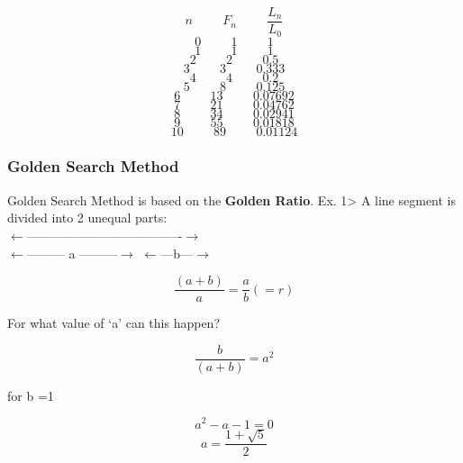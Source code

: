 \documentclass[12pt, letterpaper]{article}
\begin{document}
$$ n \hspace{1cm} F_n \hspace{1cm} \frac{L_n}{L_0}  $$
$$ 0 \hspace{1cm} 1	  \hspace{1cm}		1 $$
$$ 1 \hspace{1cm} 1	  \hspace{1cm}		1 $$
$$ 2 \hspace{1cm} 2   \hspace{1cm}		0.5 $$
$$ 3 \hspace{1cm} 3   \hspace{1cm}   	0.333 $$
$$ 4 \hspace{1cm} 4   \hspace{1cm}		0.2 $$
$$ 5 \hspace{1cm} 8   \hspace{1cm}		0.125 $$
$$ 6 \hspace{1cm} 13  \hspace{1cm}		0.07692 $$
$$ 7 \hspace{1cm} 21  \hspace{1cm}		0.04762 $$
$$ 8 \hspace{1cm} 34  \hspace{1cm}		0.02941 $$
$$ 9 \hspace{1cm} 55  \hspace{1cm}		0.01818 $$
$$ 10 \hspace{1cm}89  \hspace{1cm}		0.01124 $$

\subsubsection{Golden Search Method}
Golden Search Method is based on the \textbf{Golden Ratio}.
Ex. 1>  A line segment is divided into 2 unequal parts:\\
$\leftarrow$-------------------------------------$\rightarrow$ \\
$\leftarrow$--------- a ---------$\rightarrow$ $\leftarrow$---b---$\rightarrow$

$$\frac{(a+b)}{a} = \frac{a}{b} ( =r )$$  \begin{center}For what value of  ‘a’ can this happen?\end{center}

$$ \frac{b}{(a+b)} = a^2$$

\begin{center}
    for b =1
\end{center}
$$ a^2 -a -1 = 0 $$
$$ a = \frac{1+\sqrt{5}}{2} $$
\end{document}
